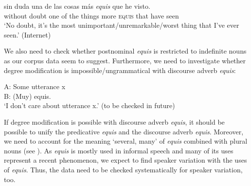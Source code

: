\documentclass[output=paper]{langsci/langscibook}
\begin{document}
\ea
\gll sin duda una de las cosas más \textit{equis} que he visto.\\
without doubt one of the things more \textsc{equis} that have seen\\
\glt ‘No doubt, it’s the most unimportant/unremarkable/worst thing that I’ve ever seen.’ (Internet)
\z

We also need to check whether postnominal \textit{equis} is restricted to indefinite nouns as our corpus data seem to suggest. Furthermore, we need to investigate whether degree modification is impossible/ungrammatical with discourse adverb \textit{equis}:

\ea
\gll A: Some utterance x \\
B: (Muy) equis.\\
\glt ‘I don’t care about utterance x.’ (to be checked in future)
\z

If degree modification is possible with discourse adverb \textit{equis}, it should be possible to unify the predicative \textit{equis} and the discourse adverb \textit{equis}. Moreover, we need to account for the meaning ‘several, many’ of \textit{equis} combined with plural nouns (see ).
As \textit{equis} is mostly used in informal speech and many of its uses represent a recent phenomenon, we expect to find speaker variation with the uses of \textit{equis}. Thus, the data need to be checked systematically for speaker variation, too.


{\sloppy\printbibliography[heading=subbibliography,notkeyword=this]}
\end{document}
